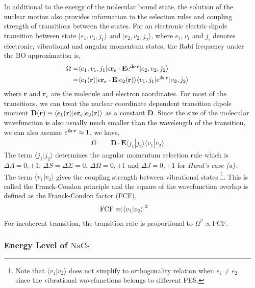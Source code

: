In additional to the energy of the molecular bound state,
the solution of the nuclear motion also provides information to the selection rules
and coupling strength of transitions between the states.
For an electronic electric dipole transition between state
$|e_1,v_1,j_1\rangle$ and $|e_2,v_2,j_2\rangle$,
where $e_i$, $v_i$ and $j_i$ denotes electronic, vibrational and angular momentum states,
the Rabi frequency under the BO approximation is,
\begin{align*}
  \Omega=&\langle e_1,v_1,j_1|e\mathbf{r}_e\cdot\mathbf{E}\mathrm{e}^{\mathrm{i}\mathbf{k}\cdot\mathbf{r}}|e_2,v_2,j_2\rangle\\
  =&\langle e_1(\mathbf{r})|e\mathbf{r}_e\cdot\mathbf{E}|e_2(\mathbf{r})\rangle\langle v_1,j_1|\mathrm{e}^{\mathrm{i}\mathbf{k}\cdot\mathbf{r}}|v_2,j_2\rangle
\end{align*}
where $\mathbf{r}$ and $\mathbf{r}_e$ are the molecule and electron coordinates.
For most of the transitions, we can treat the nuclear coordinate dependent transition dipole
moment $\mathbf{D}{\left({\mathbf{r}}\right)}\equiv\langle e_1(\mathbf{r})|e\mathbf{r}_e|e_2(\mathbf{r})\rangle$ as a constant $\mathbf{D}$.
Since the size of the molecular wavefunction is also usually much smaller than
the wavelength of the transition, we can also assume $\mathrm{e}^{\mathrm{i}\mathbf{k}\cdot\mathbf{r}}\approx 1$,
we have,
\begin{align*}
  \Omega=&\mathbf{D}\cdot\mathbf{E}\langle j_1|j_2\rangle\langle v_1|v_2\rangle
\end{align*}
The term $\langle j_1|j_2\rangle$ determines the angular momentum selection rule which is
$\Delta\Lambda=0,\pm1$, $\Delta S=\Delta\Sigma=0$, $\Delta\Omega=0,\pm1$ and $\Delta J=0,\pm1$
for \textit{Hund's case (a)}\cite{straughan_spectroscopy_1976}.
The term $\langle v_1|v_2\rangle$ gives the coupling strength between vibrational states
\footnote{Note that $\langle v_1|v_2\rangle$ does not simplify to orthogonality relation
  when $e_1\neq e_2$ since the vibrational wavefunctions belongs to different PES.}.
This is called the Franck-Condon principle and the square of the wavefunction overlap
is defined as the Franck-Condon factor (FCF),
\begin{align*}
  \mathrm{FCF}\equiv&{\left|{\langle v_1|v_2\rangle}\right|}^2
\end{align*}
For incoherent transition, the transition rate is proportional to $\Omega^2\propto\mathrm{FCF}$.

\subsubsection{Energy Level of $\mathrm{NaCs}$}

